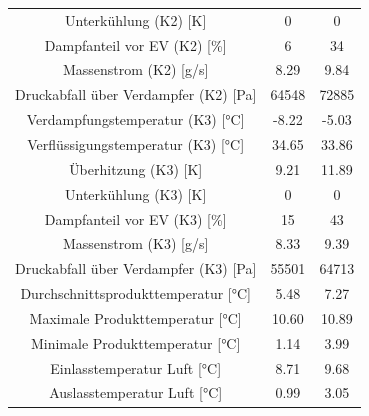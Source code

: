 \begin{table}[h!]
\begin{tabular}{|ccc|}
\multicolumn{1}{|c|}{Unterkühlung (K2) {[}K{]}}                 & \multicolumn{1}{c|}{0}     & 0                      \\
\multicolumn{1}{|c|}{Dampfanteil vor EV (K2) {[}\%{]}}          & \multicolumn{1}{c|}{6}     & 34                     \\
\multicolumn{1}{|c|}{Massenstrom (K2) {[}g/s{]}}                & \multicolumn{1}{c|}{8.29}  & 9.84                   \\
\multicolumn{1}{|c|}{Druckabfall über Verdampfer (K2) {[}Pa{]}} & \multicolumn{1}{c|}{64548} & 72885                  \\ \hline
\multicolumn{1}{|c|}{Verdampfungstemperatur (K3) {[}°C{]}}      & \multicolumn{1}{c|}{-8.22} & -5.03                  \\
\multicolumn{1}{|c|}{Verflüssigungstemperatur (K3) {[}°C{]}}    & \multicolumn{1}{c|}{34.65} & 33.86                  \\
\multicolumn{1}{|c|}{Überhitzung (K3) {[}K{]}}                  & \multicolumn{1}{c|}{9.21}  & 11.89                  \\
\multicolumn{1}{|c|}{Unterkühlung (K3) {[}K{]}}                 & \multicolumn{1}{c|}{0}     & 0                      \\
\multicolumn{1}{|c|}{Dampfanteil vor EV (K3) {[}\%{]}}          & \multicolumn{1}{c|}{15}    & 43                     \\
\multicolumn{1}{|c|}{Massenstrom (K3) {[}g/s{]}}                & \multicolumn{1}{c|}{8.33}  & 9.39                   \\
\multicolumn{1}{|c|}{Druckabfall über Verdampfer (K3) {[}Pa{]}} & \multicolumn{1}{c|}{55501} & 64713                  \\ \hline
\multicolumn{1}{|c|}{Durchschnittsprodukttemperatur {[}°C{]}}   & \multicolumn{1}{c|}{5.48}  & 7.27                   \\
\multicolumn{1}{|c|}{Maximale Produkttemperatur {[}°C{]}}       & \multicolumn{1}{c|}{10.60} & 10.89                  \\
\multicolumn{1}{|c|}{Minimale Produkttemperatur {[}°C{]}}       & \multicolumn{1}{c|}{1.14}  & 3.99                   \\
\multicolumn{1}{|c|}{Einlasstemperatur Luft {[}°C{]}}           & \multicolumn{1}{c|}{8.71}  & 9.68                   \\
\multicolumn{1}{|c|}{Auslasstemperatur Luft {[}°C{]}}           & \multicolumn{1}{c|}{0.99}  & 3.05                   \\ \hline
\end{tabular}
\end{table}




